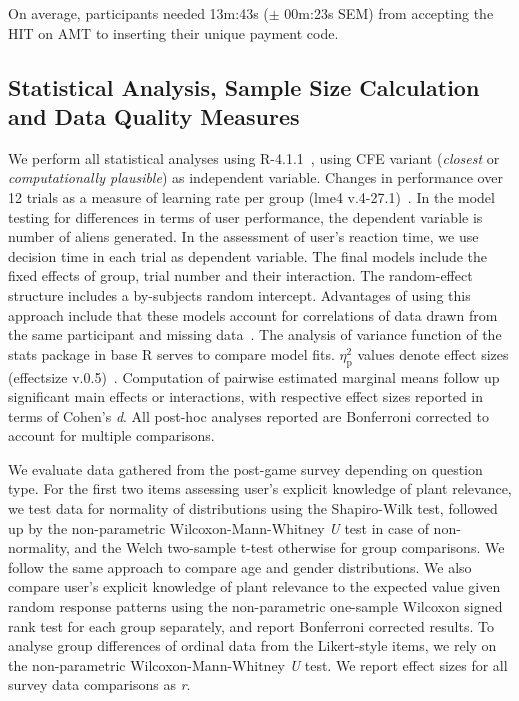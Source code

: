 On average, participants needed 13m:43s ($\pm$ 00m:23s SEM) from accepting the HIT on AMT to inserting their unique payment code.

\subsection{Statistical Analysis, Sample Size Calculation and Data Quality Measures}

We perform all statistical analyses using R-4.1.1~\citep{r_core_team_r_2021}, using \gls{CFE} variant (\textit{closest} or \textit{computationally plausible}) as independent variable.
Changes in performance over 12 trials as a measure of learning rate per group (lme4 v.4-27.1)~\citep{bates_fitting_2015}.
In the model testing for differences in terms of user performance, the dependent variable is number of aliens generated. 
In the assessment of user's reaction time, we use decision time in each trial as dependent variable.
The final models include the fixed effects of group, trial number and their interaction. The random-effect structure includes a by-subjects random intercept. 
Advantages of using this approach include that these models account for correlations of data drawn from the same participant and missing data~\citep{detry_analyzing_2016,muth_alternative_2016}.
The analysis of variance function of the stats package in base R serves to compare model fits.
$\eta_{\text{p}}^{2}$ values denote effect sizes (effectsize v.0.5)~\citep{ben-shachar_effectsize_2020}.
Computation of pairwise estimated marginal means follow up significant main effects or interactions, with respective effect sizes reported in terms of Cohen's \textit{d}.
All post-hoc analyses reported are Bonferroni corrected to account for multiple comparisons.

We evaluate data gathered from the post-game survey depending on question type.
For the first two items assessing user's explicit knowledge of plant relevance, we test data for normality of distributions using the Shapiro-Wilk test, followed up by the non-parametric Wilcoxon-Mann-Whitney \textit{U} test in case of non-normality, and the Welch two-sample t-test otherwise for group comparisons. 
We follow the same approach to compare age and gender distributions.
We also compare user's explicit knowledge of plant relevance to the expected value given random response patterns using the non-parametric one-sample Wilcoxon signed rank test for each group separately, and report Bonferroni corrected results.
To analyse group differences of ordinal data from the Likert-style items, we rely on the non-parametric Wilcoxon-Mann-Whitney \textit{U} test.
We report effect sizes for all survey data comparisons as \textit{r}.

